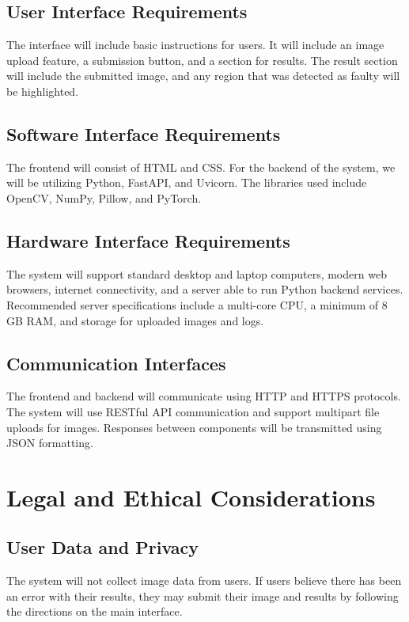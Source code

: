 \documentclass{scrreprt}
\begin{document}
\section{User Interface Requirements}
The interface will include basic instructions for users. It will include an image upload feature, a submission button, and a section for results. The result section will include the submitted image, and any region that was detected as faulty will be highlighted. 


\section{Software Interface Requirements}
The frontend will consist of HTML and CSS. For the backend of the system, we will be utilizing Python, FastAPI, and Uvicorn. The libraries used include OpenCV, NumPy, Pillow, and PyTorch.


\section{Hardware Interface Requirements}
The system will support standard desktop and laptop computers, modern web browsers, internet connectivity, and a server able to run Python backend services. Recommended server specifications include a multi-core CPU, a minimum of 8 GB RAM, and storage for uploaded images and logs.


\section{Communication Interfaces}
The frontend and backend will communicate using HTTP and HTTPS protocols. The system will use RESTful API communication and support multipart file uploads for images.  Responses between components will be transmitted using JSON formatting. 

\chapter{Legal and Ethical Considerations}

\section{User Data and Privacy}
The system will not collect image data from users. If users believe there has been an error with their results, they may submit their image and results by following the directions on the main interface. 
\end{document}
